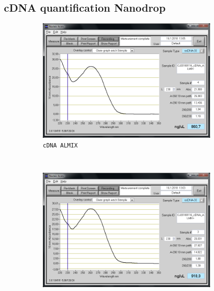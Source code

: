 \subsection{cDNA quantification Nanodrop}
\label{task:20180116_cj1}

\begin{figure}[H] %
    \centering
    \caption{Screenshots of the NanoDrop analysis of cDNA samples obtained after reverse transcription of the RNA extracted from bacterial cultures.}
    \label{fig:20180116_nanodrop}
    \begin{subfigure}[b]{0.49\textwidth}
        \includegraphics[width=\textwidth]{graphics/screenshots/CJ20180116_cDNA_ALMIX-.png}
        \caption{\texttt{cDNA ALMIX}}
        \label{sfig:CJ20180116_cDNA_ALMIX-}
    \end{subfigure}
    ~ 
    \begin{subfigure}[b]{0.49\textwidth}
        \includegraphics[width=\textwidth]{graphics/screenshots/CJ20180116_cDNA_ALMIX+.png}

\end{subfigure}
\end{figure}
